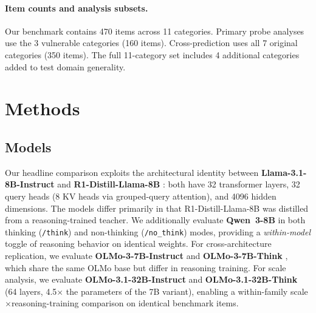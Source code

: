 \documentclass{article}
\begin{document}
\paragraph{Item counts and analysis subsets.}
Our benchmark contains 470 items across 11 categories.  Primary probe
analyses use the 3 vulnerable categories (160 items).  Cross-prediction
uses all 7 original categories (350 items).  The full 11-category set
includes 4 additional categories added to test domain generality.


\section{Methods}
\label{sec:methods}

\subsection{Models}

Our headline comparison exploits the architectural identity between
\textbf{Llama-3.1-8B-Instruct} \citep{llama31} and
\textbf{R1-Distill-Llama-8B} \citep{deepseekr1}: both have 32
transformer layers, 32 query heads (8 KV heads via grouped-query
attention), and 4096 hidden dimensions.  The models differ primarily in that
R1-Distill-Llama-8B was distilled from a reasoning-trained teacher.  We
additionally evaluate \textbf{Qwen~3-8B} in both thinking (\texttt{/think})
and non-thinking (\texttt{/no\_think}) modes, providing a
\emph{within-model} toggle of reasoning behavior on identical weights.
For cross-architecture replication, we evaluate
\textbf{OLMo-3-7B-Instruct} and \textbf{OLMo-3-7B-Think}
\citep{olmo3}, which share the same OLMo base but differ in reasoning
training.  For scale analysis, we evaluate
\textbf{OLMo-3.1-32B-Instruct} and \textbf{OLMo-3.1-32B-Think}
(64 layers, 4.5$\times$ the parameters of the 7B variant), enabling
a within-family scale$\times$reasoning-training comparison on identical
benchmark items.
\end{document}
